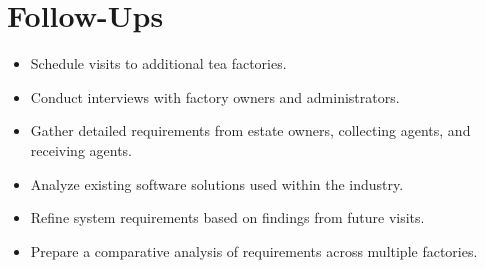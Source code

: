 \section*{Follow-Ups}
\begin{itemize}
  \item Schedule visits to additional tea factories.
  \item Conduct interviews with factory owners and administrators.
  \item Gather detailed requirements from estate owners, collecting agents, and receiving agents.
  \item Analyze existing software solutions used within the industry.
  \item Refine system requirements based on findings from future visits.
  \item Prepare a comparative analysis of requirements across multiple factories.
\end{itemize}
